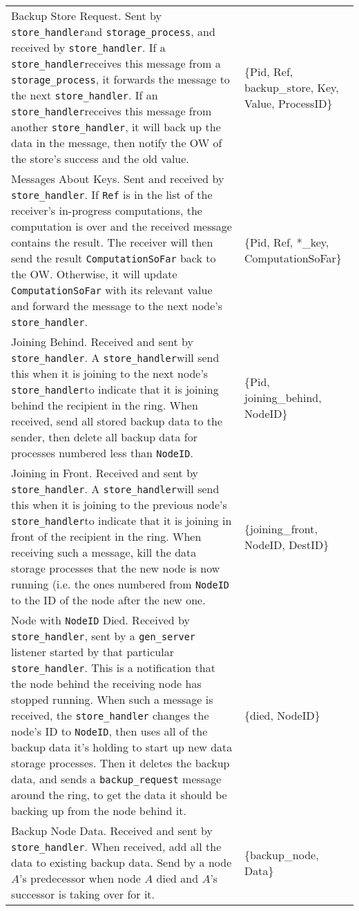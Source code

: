 \documentclass[12pt,letterpaper]{article}
\renewcommand{\tt}[1]{\texttt{#1}}
\newcommand{\sh}{\tt{store\_handler}}
\renewcommand{\sp}{\tt{storage\_process}}
\newcommand{\gs}{\tt{gen\_server}}
\begin{document}
\begin{longtable}{p{4.5in}T}
Backup Store Request. Sent by \sh and \sp, and received by \sh. If a \sh receives this message from a \sp, it forwards the message to the next \sh. If an \sh receives this message from another \sh, it will back up the data in the message, then notify the OW of the store's success and the old value. & 
\{Pid, Ref, backup\_store, Key, Value, ProcessID\} \\

Messages About Keys.  Sent and received by \sh.  If \tt{Ref} is in the list of the receiver's in-progress computations, the computation is over and the received message contains the result. The receiver will then send the result \tt{ComputationSoFar} back to the OW.  Otherwise, it will update \tt{ComputationSoFar} with its relevant value and forward the message to the next node's \sh.  &
\{Pid, Ref, *\_key, ComputationSoFar\} \\

Joining Behind. Received and sent by \sh. A \sh will send this when it is joining to the next node's \sh to indicate that it is joining behind the recipient in the ring. When received, send all stored backup data to the sender, then delete all backup data for processes numbered less than \tt{NodeID}. &
\{Pid, joining\_behind, NodeID\} \\

Joining in Front.  Received and sent by \sh. A \sh will send this when it is joining to the previous node's \sh to indicate that it is joining in front of the recipient in the ring. When receiving such a message, %
kill the data storage processes that the new node is now running (i.e. the ones numbered from \tt{NodeID} to the ID of the node after the new one. &
\{joining\_front, NodeID, DestID\} \\

Node with \tt{NodeID} Died.  Received by \sh, sent by a \gs{} listener started by that particular \sh. This is a notification that the node behind the receiving node has stopped running. When such a message is received, the \sh{} changes the node's ID to \tt{NodeID}, then uses all of the backup data it's holding to start up new data storage processes.  Then it deletes the backup data, and sends a \tt{backup\_request} message around the ring, to get the data it should be backing up from the node behind it. & \{died, NodeID\} \\

Backup Node Data.  Received and sent by \sh.  When received, add all the data to existing backup data. Send by a node $A$'s predecessor when node $A$ died and $A$'s successor is taking over for it.&
\{backup\_node, Data\} \\


\end{longtable}
\end{document}
